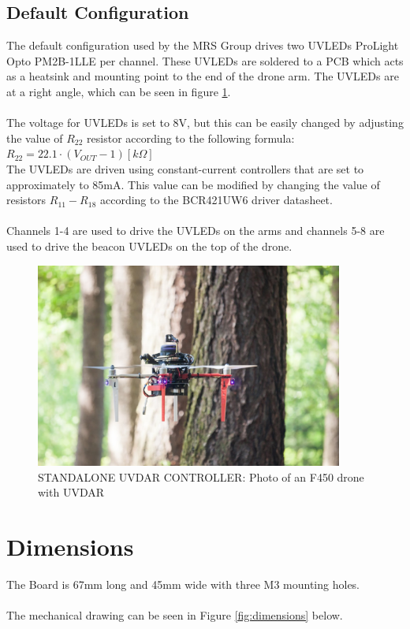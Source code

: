 \documentclass[12pt, a4paper]{article}
\begin{document}
\subsection{Default Configuration}
The default configuration used by the MRS Group drives two UVLEDs ProLight Opto PM2B-1LLE per channel. These UVLEDs are soldered to a PCB which acts as a heatsink and mounting point to the end of the drone arm. The UVLEDs are at a right angle, which can be seen in figure \ref{fig:f450_with_uvdar}.\\\
\\
The voltage for UVLEDs is set to 8V, but this can be easily changed by adjusting the value of $R_{22}$ resistor according to the following formula:\\
$R_{22} = 22.1 \cdot \left(V_{OUT} - 1 \right) \left[ k\Omega \right]$
\\
The UVLEDs are driven using constant-current controllers that are set to approximately to 85mA. This value can be modified by changing the value of resistors $R_{11} - R_{18}$ according to the BCR421UW6 driver datasheet.\\
\\
Channels 1-4 are used to drive the UVLEDs on the arms and channels 5-8 are used to drive the beacon UVLEDs on the top of the drone.

\begin{figure}[h]
\centering
\includegraphics[width=0.9\textwidth]{figures/f450_with_UVDAR.jpg}
\caption{STANDALONE UVDAR CONTROLLER: Photo of an F450 drone with UVDAR}
\label{fig:f450_with_uvdar}
\end{figure}


\pagebreak
\section{Dimensions}
The Board is 67mm long and 45mm wide with three M3 mounting holes.\\
\\
The mechanical drawing can be seen in Figure \ref{fig:dimensions} below.
\end{document}
